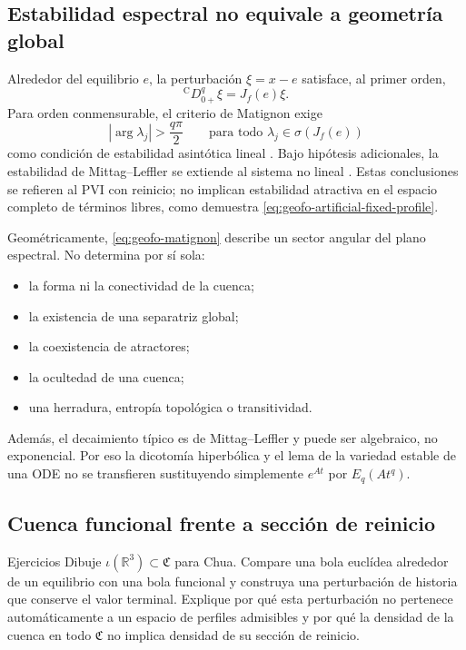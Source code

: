 \subsection{Estabilidad espectral no equivale a geometría global}

Alrededor del equilibrio \(e\), la perturbación \(\xi=x-e\) satisface, al
primer orden,
\begin{equation}
 {}^{\mathrm C}D_{0+}^{q}\xi=J_f(e)\xi.
 \label{eq:geofo-linearization}
\end{equation}
Para orden conmensurable, el criterio de Matignon exige
\begin{equation}
 |\arg\lambda_j|>\frac{q\pi}{2}
 \qquad\text{para todo }\lambda_j\in\sigma(J_f(e))
 \label{eq:geofo-matignon}
\end{equation}
como condición de estabilidad asintótica lineal
\cite{Matignon1996}. Bajo hipótesis adicionales, la estabilidad de
Mittag--Leffler se extiende al sistema no lineal
\cite{LiChenPodlubny2009,CongTuanTrinh2020Asymptotic}. Estas conclusiones
se refieren al PVI con reinicio; no implican estabilidad atractiva en el
espacio completo de términos libres, como demuestra
\cref{eq:geofo-artificial-fixed-profile}.

Geométricamente, \cref{eq:geofo-matignon} describe un sector angular del plano
espectral. No determina por sí sola:
\begin{itemize}
 \item la forma ni la conectividad de la cuenca;
 \item la existencia de una separatriz global;
 \item la coexistencia de atractores;
 \item la ocultedad de una cuenca;
 \item una herradura, entropía topológica o transitividad.
\end{itemize}
Además, el decaimiento típico es de Mittag--Leffler y puede ser algebraico, no
exponencial. Por eso la dicotomía hiperbólica y el lema de la variedad estable
de una ODE no se transfieren sustituyendo simplemente \(e^{At}\) por
\(E_q(At^q)\).

\subsection{Cuenca funcional frente a sección de reinicio}

\ifHAFOPedagogy
\begin{bloqueestudio}{Ejercicios}
Dibuje \(\iota(\mathbb R^3)\subset\mathfrak C\) para Chua. Compare una bola
euclídea alrededor de un equilibrio con una bola funcional y construya una
perturbación de historia que conserve el valor terminal. Explique por qué
esta perturbación no pertenece automáticamente a un espacio de perfiles
admisibles y por qué la densidad de la cuenca en todo \(\mathfrak C\) no
implica densidad de su sección de reinicio.
\end{bloqueestudio}
\fi
\label{subsec:geofo-two-basins}

